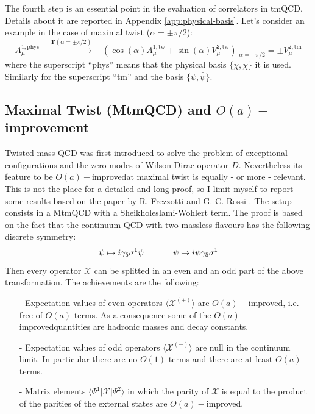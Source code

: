 \documentclass[english, LaM, oneside, noexaminfo]{sapthesis}
\newcommand{\la}{\langle}
\newcommand{\ra}{\rangle}
\newcommand{\oaid}{$O(a)-$improved}
\newcommand{\oait}{$O(a)-$improvement}
\begin{document}
\noindent
The fourth step is an essential point in the evaluation of correlators in tmQCD.
Details about it are reported in Appendix \ref{app:physical-basis}.
Let's consider an example in the case of maximal twist ($\alpha = \pm\pi/2$):
\begin{equation*}
    A_\mu^{1,\text{phys}} \quad \xrightarrow{\mathbf{T}(\alpha = \pm\pi/2)} \quad \left( \cos (\alpha) A_\mu^{1,\text{tw}} + \sin (\alpha) V_\mu^{2,\text{tw}}\right)\bigg|_{\alpha = \pm\pi/2} = \pm V_\mu^{2,\text{tm}}
\end{equation*}
where the superscript ``phys'' means that the physical basis $\{\chi,\bar \chi\}$ it is used. Similarly for the superscript ``tm'' and the basis $\{\psi,\bar\psi\}$.

\subsection{Maximal Twist (MtmQCD) and \oait}\label{sec:max-twist}
\noindent
Twisted mass QCD was first introduced to solve the problem of exceptional configurations and the zero modes of Wilson-Dirac operator $D$.
Nevertheless its feature to be \oaid\space at maximal twist is equally - or more - relevant.
\newline
This is not the place for a detailed and long proof, so I limit myself to report some results based on the paper by R. Frezzotti and G. C. Rossi \cite{FR1}.
The setup consists in a MtmQCD with a Sheikholeslami-Wohlert term.
The proof is based on the fact that the continuum QCD with two massless flavours has the following discrete symmetry:
\begin{equation*}
    \psi \mapsto i\gamma_5 \sigma^1 \psi
    \hspace*{1.2cm}
    \bar \psi \mapsto i \bar \psi \gamma_5 \sigma^1
\end{equation*}
Then every operator $\mathcal{X}$ can be splitted in an even and an odd part of the above transformation.
The achievements are the following:
\begin{itemize}
    \item [-] Expectation values of even operators $\la\mathcal{X}^{(+)}\ra$ are \oaid, i.e. free of $O(a)$ terms.
        As a consequence some of the \oaid\space quantities are hadronic masses and decay constants.
    \item [-] Expectation values of odd operators $\la\mathcal{X}^{(-)}\ra$ are null in the continuum limit.
        In particular there are no $O(1)$ terms and there are at least $O(a)$ terms.
    \item [-] Matrix elements $\la \Psi^1 | \mathcal{X} | \Psi^2 \ra$ in which the parity of $\mathcal{X}$ is equal to the product of the parities of the external states are \oaid.
\end{itemize}
\end{document}
